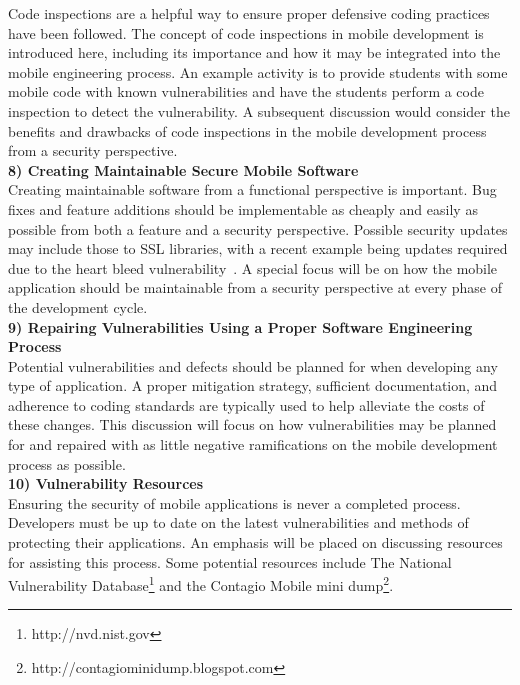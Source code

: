 \documentclass[conference]{IEEEtran}
\begin{document}
Code inspections are a helpful way to ensure proper defensive coding practices have been followed. The concept of code inspections in mobile development is introduced here, including its importance and how it may be integrated into the mobile engineering process. An example activity is to provide students with some mobile code with known vulnerabilities and have the students perform a code inspection to detect the vulnerability. A subsequent discussion would consider the benefits and drawbacks of code inspections in the mobile development process from a security perspective.\\

\textbf{8) Creating Maintainable Secure Mobile Software}\\
Creating maintainable software from a functional perspective is important. Bug fixes and feature additions should be implementable as cheaply and easily as possible from both a feature and a security perspective. Possible security updates may include those to SSL libraries, with a recent example being updates required due to the heart bleed vulnerability~\cite{heartbleed_URL}. A special focus will be on how the mobile application should be maintainable from a security perspective at every phase of the development cycle. \\

\textbf{9) Repairing Vulnerabilities Using a Proper Software Engineering Process}\\
Potential vulnerabilities and defects should be planned for when developing any type of application. A proper mitigation strategy, sufficient documentation, and adherence to coding standards are typically used to help alleviate the costs of these changes. This discussion will focus on how vulnerabilities may be planned for and repaired with as little negative ramifications on the mobile development process as possible. \\

\textbf{10) Vulnerability Resources}\\
Ensuring the security of mobile applications is never a completed process. Developers must be up to date on the latest vulnerabilities and methods of protecting their applications. An emphasis will be placed on discussing resources for assisting this process. Some potential resources include The National Vulnerability Database\footnote{http://nvd.nist.gov} and the Contagio Mobile mini dump\footnote{http://contagiominidump.blogspot.com}.\\
\end{document}
